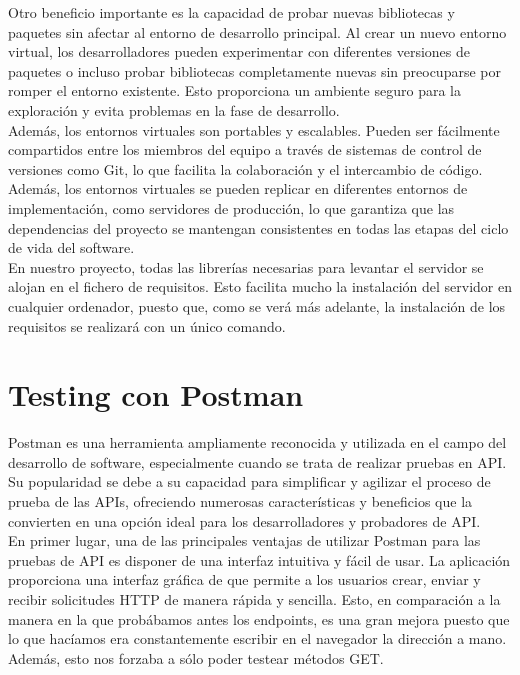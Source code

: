 \documentclass[12pt]{report}
\begin{document}
Otro beneficio importante es la capacidad de probar nuevas bibliotecas y paquetes sin afectar al entorno de desarrollo principal. Al crear un nuevo entorno virtual, los desarrolladores pueden experimentar con diferentes versiones de paquetes o incluso probar bibliotecas completamente nuevas sin preocuparse por romper el entorno existente. Esto proporciona un ambiente seguro para la exploración y evita problemas en la fase de desarrollo.\\

Además, los entornos virtuales son portables y escalables. Pueden ser fácilmente compartidos entre los miembros del equipo a través de sistemas de control de versiones como Git, lo que facilita la colaboración y el intercambio de código. Además, los entornos virtuales se pueden replicar en diferentes entornos de implementación, como servidores de producción, lo que garantiza que las dependencias del proyecto se mantengan consistentes en todas las etapas del ciclo de vida del software.\\

En nuestro proyecto, todas las librerías necesarias para levantar el servidor se alojan en el fichero de requisitos. Esto facilita mucho la instalación del servidor en cualquier ordenador, puesto que, como se verá más adelante, la instalación de los requisitos se realizará con un único comando.


\section{Testing con Postman}
Postman es una herramienta ampliamente reconocida y utilizada en el campo del desarrollo de software, especialmente cuando se trata de realizar pruebas en API. Su popularidad se debe a su capacidad para simplificar y agilizar el proceso de prueba de las APIs, ofreciendo numerosas características y beneficios que la convierten en una opción ideal para los desarrolladores y probadores de API.\\
En primer lugar, una de las principales ventajas de utilizar Postman para las pruebas de API es disponer de una interfaz intuitiva y fácil de usar. La aplicación proporciona una interfaz gráfica de que permite a los usuarios crear, enviar y recibir solicitudes HTTP de manera rápida y sencilla. Esto, en comparación a la manera en la que probábamos antes los endpoints, es una gran mejora puesto que lo que hacíamos era constantemente escribir en el navegador la dirección a mano. Además, esto nos forzaba a sólo poder testear métodos GET.\\
\end{document}
